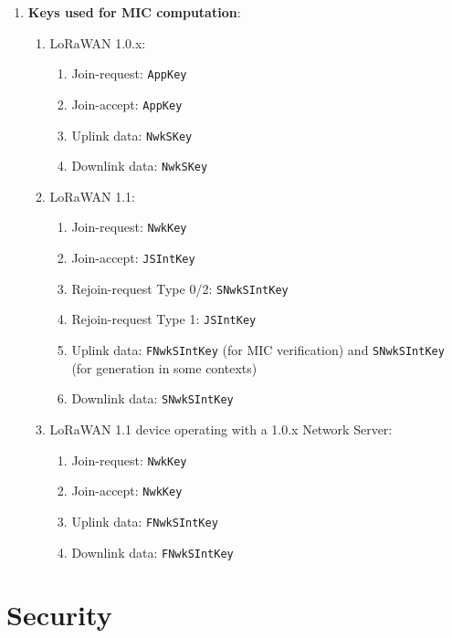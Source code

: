 \begin{enumerate}
    \item \textbf{Keys used for MIC computation}:
          \begin{enumerate}
              \item LoRaWAN 1.0.x:
                    \begin{enumerate}
                        \item Join-request: \texttt{AppKey}
                        \item Join-accept: \texttt{AppKey}
                        \item Uplink data: \texttt{NwkSKey}
                        \item Downlink data: \texttt{NwkSKey}
                    \end{enumerate}
              \item LoRaWAN 1.1:
                    \begin{enumerate}
                        \item Join-request: \texttt{NwkKey}
                        \item Join-accept: \texttt{JSIntKey}
                        \item Rejoin-request Type 0/2: \texttt{SNwkSIntKey}
                        \item Rejoin-request Type 1: \texttt{JSIntKey}
                        \item Uplink data: \texttt{FNwkSIntKey} (for MIC verification) and \texttt{SNwkSIntKey} (for generation in some contexts)
                        \item Downlink data: \texttt{SNwkSIntKey}
                    \end{enumerate}
              \item LoRaWAN 1.1 device operating with a 1.0.x Network Server:
                    \begin{enumerate}
                        \item Join-request: \texttt{NwkKey}
                        \item Join-accept: \texttt{NwkKey}
                        \item Uplink data: \texttt{FNwkSIntKey}
                        \item Downlink data: \texttt{FNwkSIntKey}
                    \end{enumerate}
          \end{enumerate}
\end{enumerate}


\section{Security}

